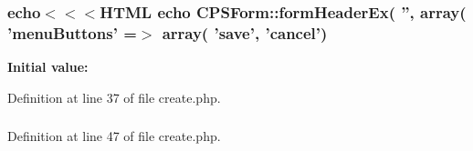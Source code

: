 \hypertarget{create_8php_a2e825f14d55b6ef1004d21af5dd9786b}{
\subsubsection[{array}]{\setlength{\rightskip}{0pt plus 5cm}echo$<$$<$$<${\bf HTML} echo CPSForm::formHeaderEx( '', {\bf array}( 'menuButtons' =$>$ {\bf array}( 'save', 'cancel')}}
\label{create_8php_a2e825f14d55b6ef1004d21af5dd9786b}
{\bfseries Initial value:}


Definition at line 37 of file create.php.

\hypertarget{create_8php_a2c8135527015cd4586959ac7c2ffec92}{
\subsubsection[{HTML}]{}}
\label{create_8php_a2c8135527015cd4586959ac7c2ffec92}


Definition at line 47 of file create.php.

